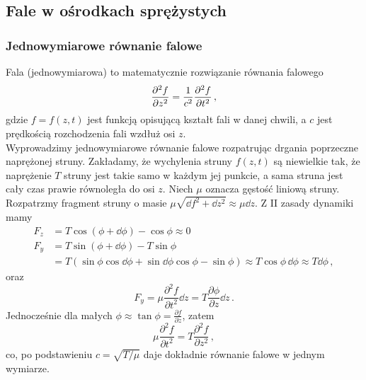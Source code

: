 \documentclass[../main.tex]{subfiles}
\begin{document}
        \subsection{Fale w ośrodkach sprężystych}
        \subsubsection{Jednowymiarowe równanie falowe}
        Fala (jednowymiarowa) to matematycznie rozwiązanie równania falowego
        \begin{equation*}
            \pdv[2]{f}{z}=\frac{1}{c^2}\pdv[2]{f}{t}\,,
        \end{equation*}
        gdzie \(f=f(z,t)\) jest funkcją opisującą kształt fali w danej chwili, a \(c\) jest
        prędkością rozchodzenia fali wzdłuż osi \(z\).\\
        Wyprowadzimy jednowymiarowe równanie falowe rozpatrując drgania poprzeczne naprężonej
        struny. Zakładamy, że wychylenia struny \(f(z,t)\) są niewielkie tak, że naprężenie \(T\)
        struny jest takie samo w każdym jej punkcie, a sama struna jest cały czas prawie równoległa
        do osi \(z\). Niech \(\mu\) oznacza gęstość liniową struny. Rozpatrzmy fragment struny o
        masie \(\mu\sqrt{\dd{f}^2+\dd{z}^2}\approx\mu \dd{z}\). Z II zasady dynamiki mamy
        \begin{equation*}
        \begin{split}
            F_z&=T\cos(\phi+\dd{\phi})-\cos\phi\approx 0\\
            F_y&=T\sin(\phi+\dd{\phi})-T\sin\phi\\
            &=T(\sin\phi\cos \dd{\phi}+\sin \dd{\phi}\cos \phi-\sin \phi)\approx T\cos\phi\,\dd{\phi}\approx T\dd{\phi}\,,
        \end{split}
        \end{equation*}
        oraz
        \begin{equation*}
            F_y=\mu\frac{\partial^2f}{\partial t^2}\dd{z}=T\frac{\partial \phi}{\partial z}\dd{z}\,.
        \end{equation*}
        Jednocześnie dla małych \(\phi\approx \tan\phi =\frac{\partial f}{\partial z}\), zatem
        \begin{equation*}
            \mu\frac{\partial^2f}{\partial t^2} =T\frac{\partial^2f}{\partial z^2}\,,
        \end{equation*}
       co, po podstawieniu \(c=\sqrt{T/\mu}\) daje dokładnie równanie falowe w jednym wymiarze.\\
\end{document}
